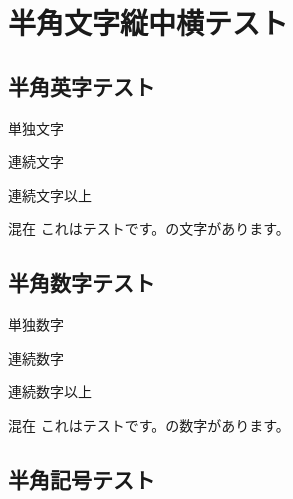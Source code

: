 \hypertarget{ux534aux89d2ux6587ux5b57ux7e26ux4e2dux6a2aux30c6ux30b9ux30c8}{%
\section{半角文字縦中横テスト}\label{ux534aux89d2ux6587ux5b57ux7e26ux4e2dux6a2aux30c6ux30b9ux30c8}}

\hypertarget{ux534aux89d2ux82f1ux5b57ux30c6ux30b9ux30c8}{%
\subsection{半角英字テスト}\label{ux534aux89d2ux82f1ux5b57ux30c6ux30b9ux30c8}}

単独文字\tatechuyoko*{:}  
 

連続文字\tatechuyoko*{:} {\small{}}
{\small{}} {\small{}}
{\small{}}

連続文字以上\tatechuyoko*{:}

混在\tatechuyoko*{:}
これはテストです。{\small{}}の文字{\small{}}があります。

\hypertarget{ux534aux89d2ux6570ux5b57ux30c6ux30b9ux30c8}{%
\subsection{半角数字テスト}\label{ux534aux89d2ux6570ux5b57ux30c6ux30b9ux30c8}}

単独数字\tatechuyoko*{:}  
 

連続数字\tatechuyoko*{:} {\small{}}
{\small{}} {\small{}}
{\small{}}

連続数字以上\tatechuyoko*{:}

混在\tatechuyoko*{:}
これはテストです。{\small{}}の数字{\small{}}があります。

\hypertarget{ux534aux89d2ux8a18ux53f7ux30c6ux30b9ux30c8}{%
\subsection{半角記号テスト}\label{ux534aux89d2ux8a18ux53f7ux30c6ux30b9ux30c8}}

